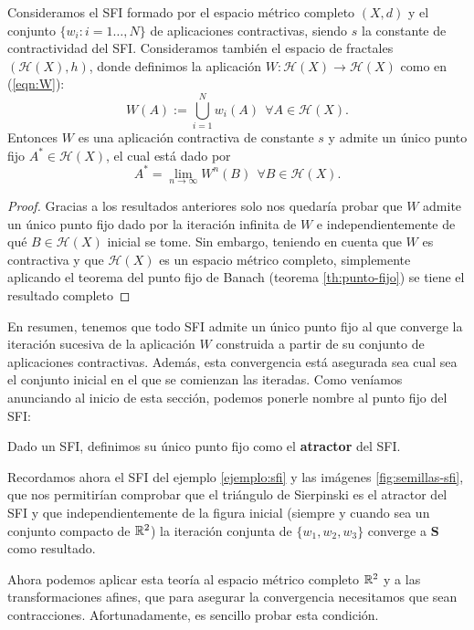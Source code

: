 \begin{teorema}
    Consideramos el SFI formado por el espacio métrico completo $(X,d)$ y el conjunto $\{w_i:i=1\dots, N\}$ de aplicaciones contractivas, siendo $s$ la constante de contractividad del SFI. Consideramos también el espacio de fractales $(\mathcal{H}(X),h)$, donde definimos la aplicación $W:\mathcal{H}(X)\longrightarrow\mathcal{H}(X)$ como en (\ref{eqn:W}):
    $$
    W(A) := \bigcup_{i=1}^N w_i(A) \ \ \forall A\in\mathcal{H}(X).
    $$
    Entonces $W$ es una aplicación contractiva de constante $s$ y admite un único punto fijo $A^*\in\mathcal{H}(X)$, el cual está dado por 
    $$
    A^*=\lim_{n\rightarrow\infty} W^n(B) \ \ \forall B\in\mathcal{H}(X).
    $$

\end{teorema}
\begin{proof}
    Gracias a los resultados anteriores solo nos quedaría probar que $W$ admite un único punto fijo dado por la iteración infinita de $W$ e independientemente de qué $B\in\mathcal{H}(X)$ inicial se tome. Sin embargo, teniendo en cuenta que $W$ es contractiva y que $\mathcal{H}(X)$ es un espacio métrico completo, simplemente aplicando el teorema del punto fijo de Banach (teorema \ref{th:punto-fijo}) se tiene el resultado completo
\end{proof}

En resumen, tenemos que todo SFI admite un único punto fijo al que converge la iteración sucesiva de la aplicación $W$ construida a partir de su conjunto de aplicaciones contractivas. Además, esta convergencia está asegurada sea cual sea el conjunto inicial en el que se comienzan las iteradas. Como veníamos anunciando al inicio de esta sección, podemos ponerle nombre al punto fijo del SFI:

\begin{definicion}[Atractor]
    Dado un SFI, definimos su único punto fijo como el \textbf{atractor} del SFI.    
\end{definicion}

Recordamos ahora el SFI del ejemplo \ref{ejemplo:sfi} y las imágenes \ref{fig:semillas-sfi}, que nos permitirían comprobar que el triángulo de Sierpinski es el atractor del SFI y que independientemente de la figura inicial (siempre y cuando sea un conjunto compacto de $\mathbb{R}^2$) la iteración conjunta de $\{w_1,w_2,w_3\}$ converge a $\mathbf{S}$ como resultado.

Ahora podemos aplicar esta teoría al espacio métrico completo $\mathbb{R}^2$ y a las transformaciones afines, que para asegurar la convergencia necesitamos que sean contracciones. Afortunadamente, es sencillo probar esta condición.

